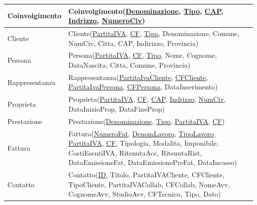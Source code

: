 \documentclass{elegantbook}
\begin{document}
\begin{longtable}{|p{3cm}|p{12cm}|}
		\hline
		Coinvolgimento & Coinvolgimento(\underline{Denominazione}, \underline{Tipo}, \underline{CAP}, \underline{Indrizzo}, \underline{NumeroCiv})\\
		\hline
		Cliente & Cliente(\underline{PartitaIVA}, \underline{CF}, \underline{Tipo}, Denominazione, Comune, NumCiv, Citta, CAP, Indirizzo, Provincia)\\
		\hline
		Persona & Persona(\underline{PartitaIVA}, \underline{CF}, \underline{Tipo}, Nome, Cognome, DataNascita, Citta, Comune, Provincia)\\
		\hline
		Rappresentanza & Rappresentanza(\underline{PartitaIvaCliente}, \underline{CFCliente}, \underline{PartitaIvaPersona}, \underline{CFPersona}, DataInserimento)\\
		\hline
		Proprieta & Proprieta(\underline{PartitaIVA}, \underline{CF}, \underline{CAP}, \underline{Indrizzo}, \underline{NumCiv}, DataInizioProp, DataFineProp)\\
		\hline
		Prestazione &Prestazione(\underline{Denominazione}, \underline{Tipo}, \underline{PartitaIVA}, \underline{CF})\\ 
		\hline
		Fattura & Fattura(\underline{NumeroFat}, \underline{DenomLavoro}, \underline{TipoLavoro}, \underline{PartitaIVA}, \underline{CF}, Tipologia, Modalita, Imponibile, CostiEsentiIVA, RitenutaAcc, RitenutaRist, DataEmissioneFat, DataEmissionePreFat, DataIncasso)\\
		\hline
		Contatto & Contatto(\underline{ID}, Titolo, PartitaIVACliente, CFCliente, TipoCliente, PartitaIVACollab, CFCollab, NomeAvv, CognomeAvv, StudioAvv, CFTecnico, Tipo, Dato)\\
		\hline
	\end{longtable}
	
\end{document}
